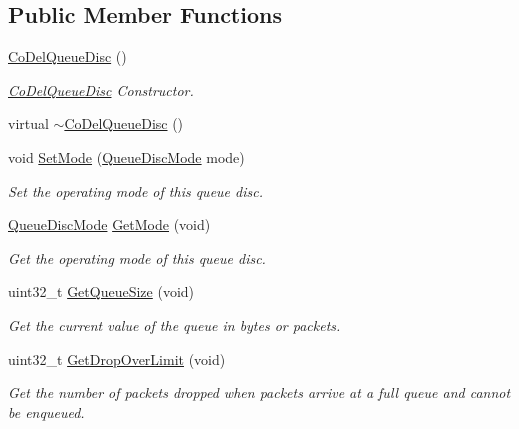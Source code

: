 \subsection*{Public Member Functions}
\begin{DoxyCompactItemize}
\item 
\hyperlink{classns3_1_1CoDelQueueDisc_ac43cda83c2fecc79ed4975d226c76b66}{Co\+Del\+Queue\+Disc} ()
\begin{DoxyCompactList}\small\item\em \hyperlink{classns3_1_1CoDelQueueDisc}{Co\+Del\+Queue\+Disc} Constructor. \end{DoxyCompactList}\item 
virtual \hyperlink{classns3_1_1CoDelQueueDisc_a33d176d9ac0408949c8ae53364aedf26}{$\sim$\+Co\+Del\+Queue\+Disc} ()
\item 
void \hyperlink{classns3_1_1CoDelQueueDisc_a5050122717a24bb94d82d807d4dd4a0e}{Set\+Mode} (\hyperlink{classns3_1_1CoDelQueueDisc_a6149d83cd9f193b54b55efa7309b79eb}{Queue\+Disc\+Mode} mode)
\begin{DoxyCompactList}\small\item\em Set the operating mode of this queue disc. \end{DoxyCompactList}\item 
\hyperlink{classns3_1_1CoDelQueueDisc_a6149d83cd9f193b54b55efa7309b79eb}{Queue\+Disc\+Mode} \hyperlink{classns3_1_1CoDelQueueDisc_ab4e1b3733d0961c823b6fa7d2e36c0bb}{Get\+Mode} (void)
\begin{DoxyCompactList}\small\item\em Get the operating mode of this queue disc. \end{DoxyCompactList}\item 
uint32\+\_\+t \hyperlink{classns3_1_1CoDelQueueDisc_a2eed623615f381b9c377ed7add064953}{Get\+Queue\+Size} (void)
\begin{DoxyCompactList}\small\item\em Get the current value of the queue in bytes or packets. \end{DoxyCompactList}\item 
uint32\+\_\+t \hyperlink{classns3_1_1CoDelQueueDisc_adff74bb49a41862a99f5900f54b7ee39}{Get\+Drop\+Over\+Limit} (void)
\begin{DoxyCompactList}\small\item\em Get the number of packets dropped when packets arrive at a full queue and cannot be enqueued. \end{DoxyCompactList}\item 

\end{DoxyCompactItemize}
